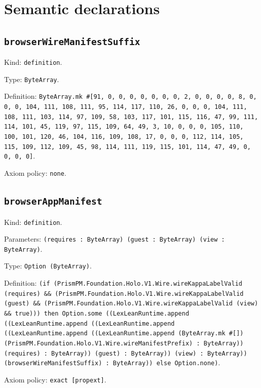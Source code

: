 \documentclass[11pt]{article}
\begin{document}
\section*{Semantic declarations}
\subsection*{\texttt{browserWireManifestSuffix}}
\noindent Kind: \texttt{definition}.\par
\noindent Type: \texttt{ByteArray}.\par
\noindent Definition: \texttt{ByteArray.mk \#[91, 0, 0, 0, 0, 0, 0, 0, 2, 0, 0, 0, 0, 8, 0, 0, 0, 104, 111, 108, 111, 95, 114, 117, 110, 26, 0, 0, 0, 104, 111, 108, 111, 103, 114, 97, 109, 58, 103, 117, 101, 115, 116, 47, 99, 111, 114, 101, 45, 119, 97, 115, 109, 64, 49, 3, 10, 0, 0, 0, 105, 110, 100, 101, 120, 46, 104, 116, 109, 108, 17, 0, 0, 0, 112, 114, 105, 115, 109, 112, 109, 45, 98, 114, 111, 119, 115, 101, 114, 47, 49, 0, 0, 0, 0]}.\par
\noindent Axiom policy: \texttt{none}.\par
\subsection*{\texttt{browserAppManifest}}
\noindent Kind: \texttt{definition}.\par
\noindent Parameters: \texttt{(requires : ByteArray) (guest : ByteArray) (view : ByteArray)}.\par
\noindent Type: \texttt{Option (ByteArray)}.\par
\noindent Definition: \texttt{(if (PrismPM.Foundation.Holo.V1.Wire.wireKappaLabelValid (requires) \&\& (PrismPM.Foundation.Holo.V1.Wire.wireKappaLabelValid (guest) \&\& (PrismPM.Foundation.Holo.V1.Wire.wireKappaLabelValid (view) \&\& true))) then Option.some ((LexLeanRuntime.append ((LexLeanRuntime.append ((LexLeanRuntime.append ((LexLeanRuntime.append ((LexLeanRuntime.append (ByteArray.mk \#[]) (PrismPM.Foundation.Holo.V1.Wire.wireManifestPrefix) : ByteArray)) (requires) : ByteArray)) (guest) : ByteArray)) (view) : ByteArray)) (browserWireManifestSuffix) : ByteArray)) else Option.none)}.\par
\noindent Axiom policy: \texttt{exact [propext]}.\par
\end{document}
